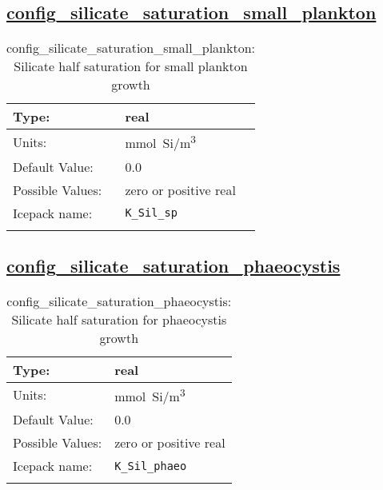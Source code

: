 \subsection[config\_silicate\_saturation\_small\_plankton]{\hyperref[sec:nm_tab_biogeochemistry]{config\_silicate\_saturation\_small\_plankton}}
\label{subsec:nm_sec_config_silicate_saturation_small_plankton}
\begin{center}
\begin{longtable}{| p{2.0in} || p{4.0in} |}
    \hline
    Type: & real \\
    \hline
    Units: & \si{mmol.Si/m^3} \\
    \hline
    Default Value: & 0.0 \\
    \hline
    Possible Values: & zero or positive real \\
    \hline
    \hline
    Icepack name: & \verb+K_Sil_sp+ \\
    \caption{config\_silicate\_saturation\_small\_plankton: Silicate half saturation for small plankton growth}
\end{longtable}
\end{center}
\subsection[config\_silicate\_saturation\_phaeocystis]{\hyperref[sec:nm_tab_biogeochemistry]{config\_silicate\_saturation\_phaeocystis}}
\label{subsec:nm_sec_config_silicate_saturation_phaeocystis}
\begin{center}
\begin{longtable}{| p{2.0in} || p{4.0in} |}
    \hline
    Type: & real \\
    \hline
    Units: & \si{mmol.Si/m^3} \\
    \hline
    Default Value: & 0.0 \\
    \hline
    Possible Values: & zero or positive real \\
    \hline
    \hline
    Icepack name: & \verb+K_Sil_phaeo+ \\
    \caption{config\_silicate\_saturation\_phaeocystis: Silicate half saturation for phaeocystis growth}
\end{longtable}
\end{center}
